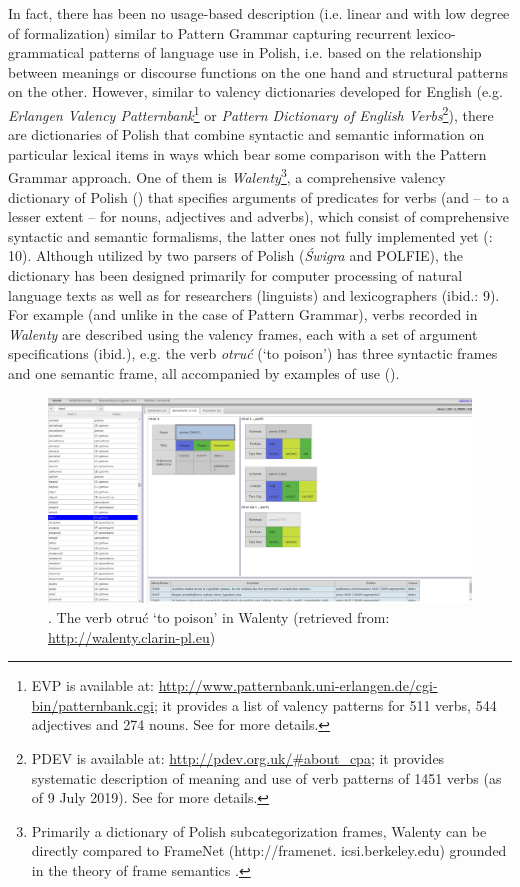 \documentclass[output=paper]{langscibook}
\begin{document}
In fact, there has been no usage-based description (i.e. linear and with low degree of formalization) similar to Pattern Grammar capturing recurrent lexico-grammatical patterns of language use in Polish, i.e. based on the relationship between meanings or discourse functions on the one hand and structural patterns on the other. However, similar to valency dictionaries developed for English (e.g. \textit{Erlangen Valency Patternbank}\footnote{EVP is available at: \url{http://www.patternbank.uni-erlangen.de/cgi-bin/patternbank.cgi}; it provides a list of valency patterns for 511 verbs, 544 adjectives and 274 nouns. See \citet{HerbstEtAl2004} for more details.} or \textit{Pattern Dictionary of English Verbs}\footnote{PDEV is available at: \url{http://pdev.org.uk/\#about_cpa}; it provides systematic description of meaning and use of verb patterns of 1451 verbs (as of 9 July 2019). See \citet{Hanks2013} for more details.}), there are dictionaries of Polish that combine syntactic and semantic information on particular lexical items in ways which bear some comparison with the Pattern Grammar approach. One of them is \textit{Walenty}\footnote{Primarily a dictionary of Polish subcategorization frames, Walenty can be directly compared to FrameNet (http://framenet. icsi.berkeley.edu) grounded in the theory of frame semantics \citep{Fillmore1982}.}, a comprehensive valency dictionary of Polish (\citealt{PrzepiórkowskiEtAl2017Phraseology,PrzepiórkowskiEtAl2017Walenty}) that specifies arguments of predicates for verbs (and -- to a lesser extent -- for nouns, adjectives and adverbs), which consist of comprehensive syntactic and semantic formalisms, the latter ones not fully implemented yet (\citealt{PrzepiórkowskiEtAl2017Phraseology}: 10). Although utilized by two parsers of Polish (\textit{Świgra} and POLFIE), the dictionary has been designed primarily for computer processing of natural language texts as well as for researchers (linguists) and lexicographers (ibid.: 9). For example (and unlike in the case of Pattern Grammar), verbs recorded in \textit{Walenty} are described using the valency frames, each with a set of argument specifications (ibid.), e.g. the verb \textit{otruć} (‘to poison’) has three syntactic frames and one semantic frame, all accompanied by examples of use ().

   
\begin{figure}
\includegraphics[width=\textwidth]{figures/grabowski-img001.png}
\caption{\label{fig:grabowski:1}. The verb otruć ‘to poison’ in Walenty (retrieved from: \url{http://walenty.clarin-pl.eu})}
\end{figure}
\end{document}
